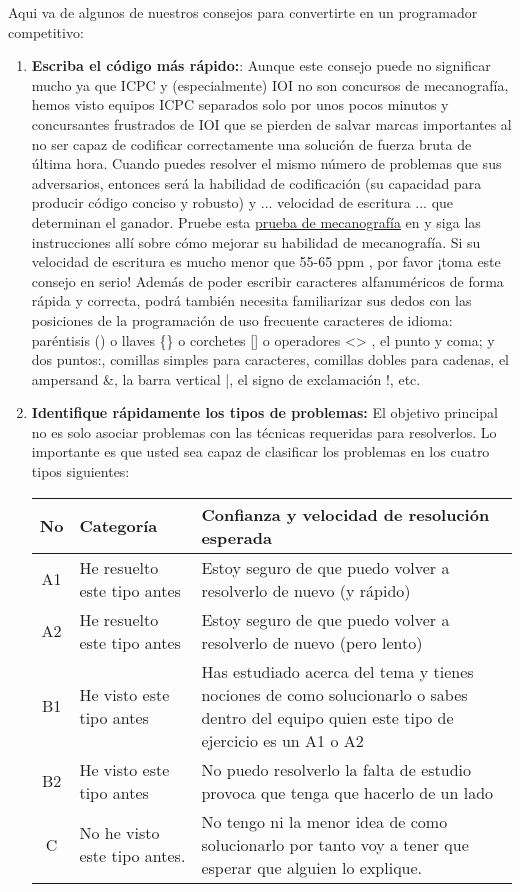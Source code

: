 Aqui va de algunos de nuestros consejos para convertirte en un programador competitivo:

\begin{enumerate}
	\item \textbf{Escriba el código más rápido:}: Aunque este consejo puede no significar mucho ya que ICPC y (especialmente) IOI no son concursos de mecanografía, hemos visto equipos ICPC separados solo por unos pocos minutos y concursantes frustrados de IOI que se pierden de salvar marcas importantes al no ser capaz de codificar correctamente una solución de fuerza bruta de última hora. Cuando puedes resolver el mismo número de problemas que sus adversarios, entonces será la habilidad de codificación (su capacidad para producir código conciso y robusto) y ... velocidad de escritura ... que determinan el ganador. Pruebe esta \href{https://www.typingtest.com}{prueba de mecanografía} en  y siga las instrucciones allí sobre cómo mejorar su habilidad de mecanografía. Si su velocidad de escritura es mucho menor que 55-65 ppm , por favor ¡toma este consejo en serio!
	Además de poder escribir caracteres alfanuméricos de forma rápida y correcta, podrá
	también necesita familiarizar sus dedos con las posiciones de la programación de uso frecuente
	caracteres de idioma: paréntisis () o llaves \{\} o corchetes [] o operadores <> ,
	el punto y coma; y dos puntos:, comillas simples para caracteres, comillas dobles para cadenas, el ampersand \&, la barra vertical  |, el signo de exclamación !, etc.
	
	\item \textbf{Identifique rápidamente los tipos de problemas:} El objetivo principal no es solo asociar problemas con las técnicas requeridas para resolverlos. Lo importante es que usted sea capaz de clasificar los problemas en los cuatro tipos siguientes:
	
	\begin{longtable}{|c|p{4.5cm}|p{8.5cm}|}
		\hline
		\textbf{No} & \textbf{Categoría} &  \textbf{Confianza y velocidad de resolución esperada} \\
		\hline
		A1& He resuelto este tipo antes & Estoy seguro de que puedo volver a resolverlo de nuevo (y rápido)  \\
		\hline
		A2& He resuelto este tipo antes  & Estoy seguro de que puedo volver a resolverlo de nuevo (pero lento) \\
		\hline
		B1& He visto este tipo antes & Has estudiado acerca del tema y tienes nociones de
		como solucionarlo o sabes dentro del equipo quien este tipo de ejercicio es un A1 o A2 \\
		\hline
		B2& He visto este tipo antes & No puedo resolverlo la falta de estudio
		provoca que tenga que hacerlo de un lado \\
		\hline
		C& No he visto este tipo antes. & No tengo ni la menor idea de como solucionarlo por tanto voy a tener que esperar que alguien lo explique. \\
		\hline
	\end{longtable}
	

\end{enumerate}
